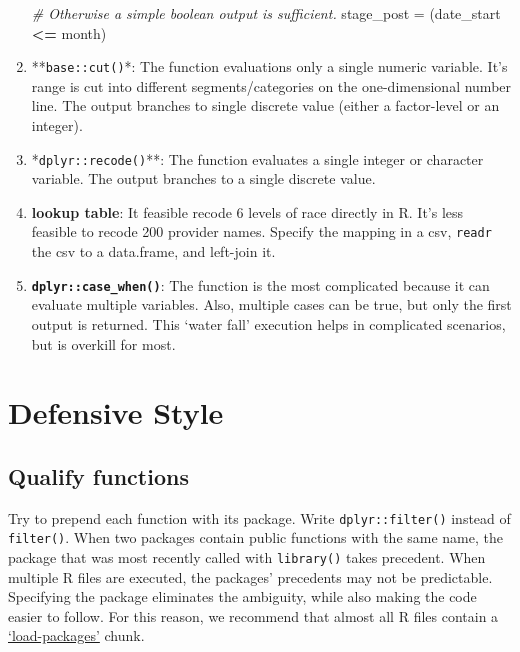 \documentclass[
]{book}
\newenvironment{Shaded}{\begin{snugshade}}{\end{snugshade}}
\newcommand{\CommentTok}[1]{\textcolor[rgb]{0.56,0.35,0.01}{\textit{#1}}}
\newcommand{\NormalTok}[1]{#1}
\newcommand{\OperatorTok}[1]{\textcolor[rgb]{0.81,0.36,0.00}{\textbf{#1}}}
\newcommand{\StringTok}[1]{\textcolor[rgb]{0.31,0.60,0.02}{#1}}
\begin{document}
\begin{enumerate}
\begin{Shaded}
\begin{Highlighting}[]
\CommentTok{\# Otherwise a simple boolean output is sufficient.}
\NormalTok{stage\_post  =}\StringTok{ }\NormalTok{(date\_start }\OperatorTok{<=}\StringTok{ }\NormalTok{month)}
\end{Highlighting}
\end{Shaded}
\item
  **\texttt{base::cut()}*: The function evaluations only a single numeric variable. It's range is cut into different segments/categories on the one-dimensional number line. The output branches to single discrete value (either a factor-level or an integer).
\item
  *\texttt{dplyr::recode()}**: The function evaluates a single integer or character variable. The output branches to a single discrete value.
\item
  \textbf{lookup table}: It feasible recode 6 levels of race directly in R. It's less feasible to recode 200 provider names. Specify the mapping in a csv, \texttt{readr} the csv to a data.frame, and left-join it.
\item
  \textbf{\texttt{dplyr::case\_when()}}: The function is the most complicated because it can evaluate multiple variables. Also, multiple cases can be true, but only the first output is returned. This `water fall' execution helps in complicated scenarios, but is overkill for most.
\end{enumerate}

\hypertarget{coding-defensive}{%
\section{Defensive Style}\label{coding-defensive}}

\hypertarget{coding-defensive-qualify-functions}{%
\subsection{Qualify functions}\label{coding-defensive-qualify-functions}}

Try to prepend each function with its package. Write \texttt{dplyr::filter()} instead of \texttt{filter()}. When two packages contain public functions with the same name, the package that was most recently called with \texttt{library()} takes precedent. When multiple R files are executed, the packages' precedents may not be predictable. Specifying the package eliminates the ambiguity, while also making the code easier to follow. For this reason, we recommend that almost all R files contain a \protect\hyperlink{chunk-load-packages}{`load-packages'} chunk.
\end{document}
